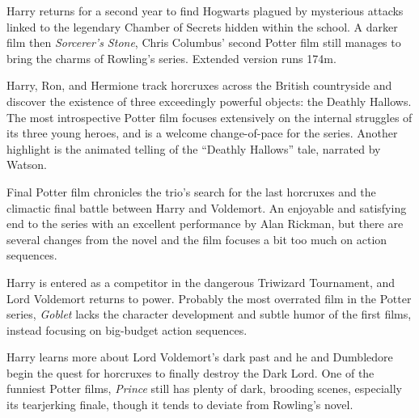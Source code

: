    Harry returns for a second year to find Hogwarts plagued by mysterious attacks linked to the legendary Chamber of Secrets hidden within the school. A darker film then \textit{Sorcerer's Stone}, Chris Columbus' second Potter film still manages to bring the charms of Rowling's series. Extended version runs 174m. \author{DW} 

   Harry, Ron, and Hermione track horcruxes across the British countryside and discover the existence of three exceedingly powerful objects: the Deathly Hallows. The most introspective Potter film focuses extensively on the internal struggles of its three young heroes, and is a welcome change-of-pace for the series. Another highlight is the animated telling of the ``Deathly Hallows'' tale, narrated by Watson. \author{DW} 

   Final Potter film chronicles the trio's search for the last horcruxes and the climactic final battle between Harry and Voldemort. An enjoyable and satisfying end to the series with an excellent performance by Alan Rickman, but there are several changes from the novel and the film focuses a bit too much on action sequences. \author{DW} 

   Harry is entered as a competitor in the dangerous Triwizard Tournament, and Lord Voldemort returns to power. Probably the most overrated film in the Potter series, \textit{Goblet} lacks the character development and subtle humor of the first films, instead focusing on big-budget action sequences. \author{DW} 

   Harry learns more about Lord Voldemort's dark past and he and Dumbledore begin the quest for horcruxes to finally destroy the Dark Lord. One of the funniest Potter films, \textit{Prince} still has plenty of dark, brooding scenes, especially its tearjerking finale, though it tends to deviate from Rowling's novel. \author{DW} 

